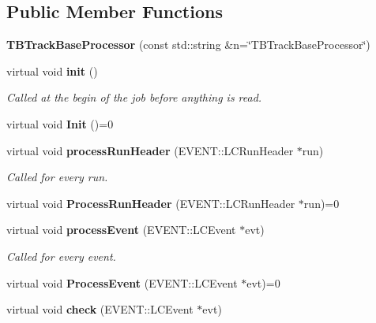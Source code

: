 \subsection*{Public Member Functions}
\begin{DoxyCompactItemize}
\item 
{\bfseries T\-B\-Track\-Base\-Processor} (const std\-::string \&n=\char`\"{}T\-B\-Track\-Base\-Processor\char`\"{})\label{classTBTrackBaseProcessor_a8e2072bc1fffd5cdf065b13e865733a0}

\item 
virtual void {\bf init} ()\label{classTBTrackBaseProcessor_a179b559dd67f1777b0622775918ae5f5}

\begin{DoxyCompactList}\small\item\em Called at the begin of the job before anything is read. \end{DoxyCompactList}\item 
virtual void {\bfseries Init} ()=0\label{classTBTrackBaseProcessor_a3efab6d4a570bdb0d0059105adef62fb}

\item 
virtual void {\bf process\-Run\-Header} (E\-V\-E\-N\-T\-::\-L\-C\-Run\-Header $\ast$run)\label{classTBTrackBaseProcessor_aaad5a1360ad4a553c91da0485cafcd7a}

\begin{DoxyCompactList}\small\item\em Called for every run. \end{DoxyCompactList}\item 
virtual void {\bfseries Process\-Run\-Header} (E\-V\-E\-N\-T\-::\-L\-C\-Run\-Header $\ast$run)=0\label{classTBTrackBaseProcessor_a644859097b4910c8c6f8c8113bfee2c6}

\item 
virtual void {\bf process\-Event} (E\-V\-E\-N\-T\-::\-L\-C\-Event $\ast$evt)\label{classTBTrackBaseProcessor_aebcd7a4fc4c6ba7e860db893168d6fae}

\begin{DoxyCompactList}\small\item\em Called for every event. \end{DoxyCompactList}\item 
virtual void {\bfseries Process\-Event} (E\-V\-E\-N\-T\-::\-L\-C\-Event $\ast$evt)=0\label{classTBTrackBaseProcessor_af0b02579767b903b46f9e220efcb83cc}

\item 
virtual void {\bf check} (E\-V\-E\-N\-T\-::\-L\-C\-Event $\ast$evt)\label{classTBTrackBaseProcessor_acdf5ee99137016fe8cc9681c0336fc85}


\end{DoxyCompactItemize}
